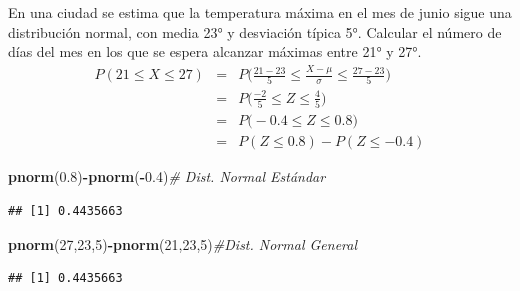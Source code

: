 \documentclass[
  ignorenonframetext,
]{beamer}
\newenvironment{Shaded}{\begin{snugshade}}{\end{snugshade}}
\newcommand{\CommentTok}[1]{\textcolor[rgb]{0.56,0.35,0.01}{\textit{#1}}}
\newcommand{\DecValTok}[1]{\textcolor[rgb]{0.00,0.00,0.81}{#1}}
\newcommand{\FloatTok}[1]{\textcolor[rgb]{0.00,0.00,0.81}{#1}}
\newcommand{\KeywordTok}[1]{\textcolor[rgb]{0.13,0.29,0.53}{\textbf{#1}}}
\newcommand{\NormalTok}[1]{#1}
\newcommand{\OperatorTok}[1]{\textcolor[rgb]{0.81,0.36,0.00}{\textbf{#1}}}
\begin{document}
\begin{frame}[fragile]{}

\justifying En una ciudad se estima que la temperatura máxima en el mes
de junio sigue una distribución normal, con media 23° y desviación
típica 5°. Calcular el número de días del mes en los que se espera
alcanzar máximas entre 21° y 27°. \[\begin{array}{rcl}
P(21 \leq X \leq 27) & = &\displaystyle P\Big( \frac{21-23}{5} \leq \frac{X-\mu}{\sigma} \leq  \frac{27-23}{5}\Big)\\ 
 &  = & \displaystyle P\Big( \frac{-2}{5} \leq Z \leq  \frac{4}{5}\Big) \\ 
 &  = & \displaystyle P\Big(-0.4 \leq Z \leq  0.8\Big) \\ 
 &  = & P(Z\leq 0.8)-P(Z\leq -0.4)
\end{array}\]

\begin{Shaded}
\begin{Highlighting}[]
\KeywordTok{pnorm}\NormalTok{(}\FloatTok{0.8}\NormalTok{)}\OperatorTok{-}\KeywordTok{pnorm}\NormalTok{(}\OperatorTok{-}\FloatTok{0.4}\NormalTok{)}\CommentTok{# Dist. Normal Estándar}
\end{Highlighting}
\end{Shaded}

\begin{verbatim}
## [1] 0.4435663
\end{verbatim}

\begin{Shaded}
\begin{Highlighting}[]
\KeywordTok{pnorm}\NormalTok{(}\DecValTok{27}\NormalTok{,}\DecValTok{23}\NormalTok{,}\DecValTok{5}\NormalTok{)}\OperatorTok{-}\KeywordTok{pnorm}\NormalTok{(}\DecValTok{21}\NormalTok{,}\DecValTok{23}\NormalTok{,}\DecValTok{5}\NormalTok{)}\CommentTok{#Dist. Normal General}
\end{Highlighting}
\end{Shaded}

\begin{verbatim}
## [1] 0.4435663
\end{verbatim}

\end{frame}

\hypertarget{section-4}{%
\subsection{}\label{section-4}}
\end{document}
